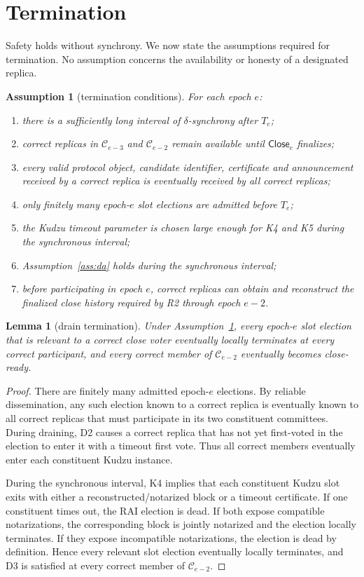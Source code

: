 \documentclass[11pt]{article}
\newtheorem{assumption}{Assumption}
\newtheorem{lemma}{Lemma}
\theoremstyle{remark}
\newcommand{\C}{\mathcal{C}}
\newcommand{\CE}{\mathsf{Close}}
\begin{document}
\section{Termination}

Safety holds without synchrony. We now state the assumptions required for termination. No assumption concerns the availability or honesty of a designated replica.

\begin{assumption}[termination conditions]
\label{ass:termination}
For each epoch $e$:
\begin{enumerate}[label=(\roman*)]
  \item there is a sufficiently long interval of $\delta$-synchrony after $T_e$;
  \item correct replicas in $\C_{e-3}$ and $\C_{e-2}$ remain available until $\CE_e$ finalizes;
  \item every valid protocol object, candidate identifier, certificate and announcement received by a correct replica is eventually received by all correct replicas;
  \item only finitely many epoch-$e$ slot elections are admitted before $T_e$;
  \item the Kudzu timeout parameter is chosen large enough for K4 and K5 during the synchronous interval;
  \item Assumption~\ref{ass:da} holds during the synchronous interval;
  \item before participating in epoch $e$, correct replicas can obtain and reconstruct the finalized close history required by R2 through epoch $e-2$.
\end{enumerate}
\end{assumption}

\begin{lemma}[drain termination]
\label{lem:drain}
Under Assumption~\ref{ass:termination}, every epoch-$e$ slot election that is relevant to a correct close voter eventually locally terminates at every correct participant, and every correct member of $\C_{e-2}$ eventually becomes close-ready.
\end{lemma}

\begin{proof}
There are finitely many admitted epoch-$e$ elections. By reliable dissemination, any such election known to a correct replica is eventually known to all correct replicas that must participate in its two constituent committees. During draining, D2 causes a correct replica that has not yet first-voted in the election to enter it with a timeout first vote. Thus all correct members eventually enter each constituent Kudzu instance.

During the synchronous interval, K4 implies that each constituent Kudzu slot exits with either a reconstructed/notarized block or a timeout certificate. If one constituent times out, the RAI election is dead. If both expose compatible notarizations, the corresponding block is jointly notarized and the election locally terminates. If they expose incompatible notarizations, the election is dead by definition. Hence every relevant slot election eventually locally terminates, and D3 is satisfied at every correct member of $\C_{e-2}$.
\end{proof}
\end{document}
